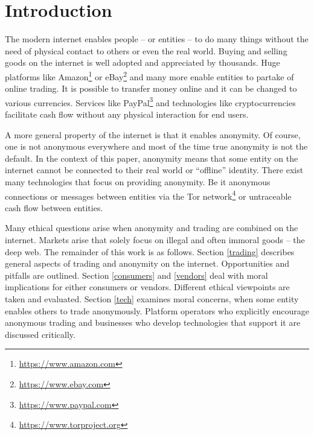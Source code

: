 \section{Introduction}


The modern internet enables people -- or entities -- to do many things without the need of physical contact to others or even the real world. Buying and selling goods on the internet is well adopted and appreciated by thousands. Huge platforms like Amazon\footnote{\url{https://www.amazon.com}} or eBay\footnote{\url{https://www.ebay.com}} and many more enable entities to partake of online trading. It is possible to transfer money online and it can be changed to various currencies. Services like PayPal\footnote{\url{https://www.paypal.com}} and technologies like cryptocurrencies facilitate cash flow without any physical interaction for end users.

A more general property of the internet is that it enables anonymity. Of course, one is not anonymous everywhere and most of the time true anonymity is not the default. In the context of this paper, anonymity means that some entity on the internet cannot be connected to their real world or ``offline'' identity. There exist many technologies that focus on providing anonymity. Be it anonymous connections or messages between entities via the Tor network\footnote{\url{https://www.torproject.org}} or untraceable cash flow between entities.

Many ethical questions arise when anonymity and trading are combined on the internet. Markets arise that solely focus on illegal and often immoral goods -- the deep web. The remainder of this work is as follows. Section \ref{trading} describes general aspects of trading and anonymity on the internet. Opportunities and pitfalls are outlined. Section \ref{consumers} and \ref{vendors} deal with moral implications for either consumers or vendors. Different ethical viewpoints are taken and evaluated. Section \ref{tech} examines moral concerns, when some entity enables others to trade anonymously. Platform operators who explicitly encourage anonymous trading and businesses who develop technologies that support it are discussed critically.